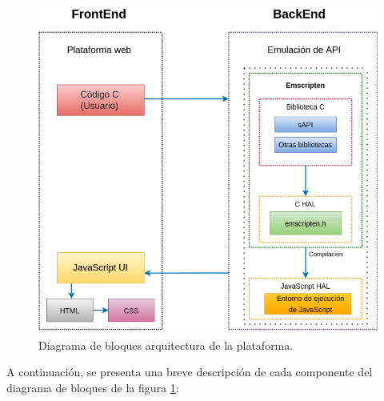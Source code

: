 \begin{figure}[ht]
	\centering
	\includegraphics[scale=.55]{./Figures/Arquitectura.png}
	\caption{Diagrama de bloques arquitectura de la plataforma.}
	\label{fig:Arquitectura}
\end{figure}

A continuación, se presenta una breve descripción de cada componente del diagrama de bloques de la figura \ref{fig:Arquitectura}:

